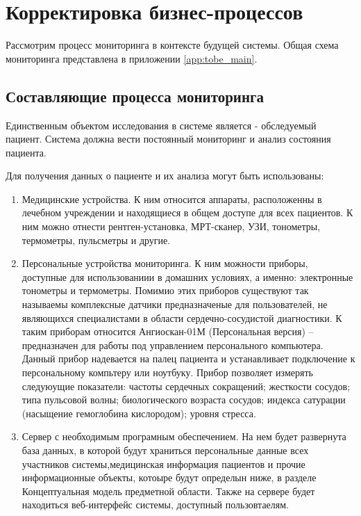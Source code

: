 \newpage
{}
\section{Корректировка бизнес-процессов}
Рассмотрим процесс мониторинга в контексте будущей системы. Общая схема
мониторинга представлена в приложении  \ref{app:tobe_main}.

\subsection{Составляющие процесса мониторинга}

Единственным объектом исследования в системе является - обследуемый пациент.
Система должна вести постоянный мониторинг и анализ состояния пациента.

Для получения данных о пациенте и их анализа могут быть использованы:

\begin{enumerate}
  \item Медицинские устройства. К ним относится аппараты, расположенны в
  лечебном учреждении и находящиеся в общем доступе для всех пациентов. К ним
  можно отнести рентген-установка, МРТ-сканер, УЗИ, тонометры, термометры,
  пульсметры и другие.
  \item Персональные устройства мониторинга. К ним можности приборы, доступные
  для использованиии в домашних условиях, а именно: электронные тонометры и
  термометры. Помимио этих приборов существуют так называемы комплексные датчики
  предназначеные для пользователей, не являющихся специалистами в области
  сердечно-сосудистой диагностики. К таким приборам относится Ангиоскан-01М
  (Персональная версия) – предназначен для работы под управлением персонального
  компьютера. Данный прибор надевается на палец пациента и устанавливает
  подключение к персональному компьтеру или ноутбуку. Прибор позволяет измерять
  следуюущие показатели: частоты сердечных сокращений; жесткости сосудов; типа
  пульсовой волны; биологического возраста сосудов; индекса сатурации (насыщение
  гемоглобина кислородом); уровня стресса.
  \item Сервер с необходимым програмным обеспечением. На нем будет развернута
  база данных, в которой будут храниться персональные данные всех участников
  системы,медицинская информация пациентов и прочие информационные объекты,
  котоыре будут определын ниже,  в разделе Концептуальная модель предметной
  области. Также на сервере будет находиться веб-интерфейс системы, доступный
  пользовтаелям.
\end{enumerate}

